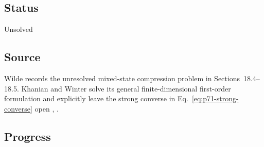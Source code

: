 \subsection*{Status}

Unsolved

\subsection*{Source}

Wilde records the unresolved mixed-state compression problem in
Sections~18.4--18.5.  Khanian and Winter solve its general finite-dimensional
first-order formulation and explicitly leave the strong converse in
Eq.~\eqref{eq:p71-strong-converse} open
,
.

\subsection*{Progress}

